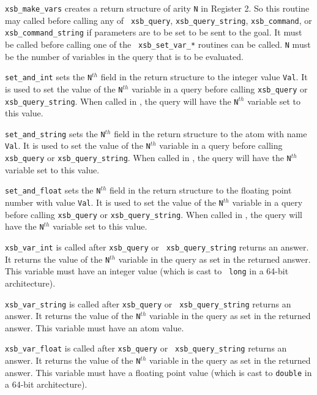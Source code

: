 \begin{description}
 
    {\tt xsb\_make\_vars} creates a return structure of arity {\tt N}
in Register 2.  So this routine may called before calling any of {\tt
xsb\_query}, {\tt xsb\_query\_string}, {\tt xsb\_command}, or {\tt
xsb\_command\_string} if parameters are to be set to be sent to the
goal.  It must be called before calling one of the {\tt
xsb\_set\_var\_*} routines can be called. {\tt N} must be the number
of variables in the query that is to be evaluated.

    {\tt set\_and\_int} sets the {\tt N}$^{th}$ field in the return
structure to the integer value {\tt Val}.  It is used to set the value of
the {\tt N}$^{th}$ variable in a query before calling {\tt xsb\_query} or
{\tt xsb\_query\_string}.  When called in \ourprolog, the query will
have the {\tt N}$^{th}$ variable set to this value.

    {\tt set\_and\_string} sets the {\tt N}$^{th}$ field in the return
structure to the atom with name {\tt Val}.  It is used to set the
value of the {\tt N}$^{th}$ variable in a query before calling {\tt
xsb\_query} or {\tt xsb\_query\_string}.  When called in \ourprolog,
the query will have the {\tt N}$^{th}$ variable set to this value.

    {\tt set\_and\_float} sets the {\tt N}$^{th}$ field in the return
structure to the floating point number with value {\tt Val}.  It is
used to set the value of the {\tt N}$^{th}$ variable in a query before
calling {\tt xsb\_query} or {\tt xsb\_query\_string}.  When called in
\ourprolog, the query will have the {\tt N}$^{th}$ variable set to this
value.

  
{\tt xsb\_var\_int} is called after {\tt xsb\_query} or {\tt
xsb\_query\_string} returns an answer.  It returns the value of the
{\tt N}$^{th}$ variable in the query as set in the returned answer.
This variable must have an integer value (which is cast to {\tt
long} in a 64-bit architecture).

 
    {\tt xsb\_var\_string} is called after {\tt xsb\_query} or {\tt
xsb\_query\_string} returns an answer.  It returns the value of the
{\tt N}$^{th}$ variable in the query as set in the returned answer.
This variable must have an atom value.

 
    {\tt xsb\_var\_float} is called after {\tt xsb\_query} or {\tt
    xsb\_query\_string} returns an answer.  It returns the value of
    the {\tt N}$^{th}$ variable in the query as set in the returned
    answer.  This variable must have a floating point value (which is
    cast to {\tt double} in a 64-bit architecture).


\end{description}


